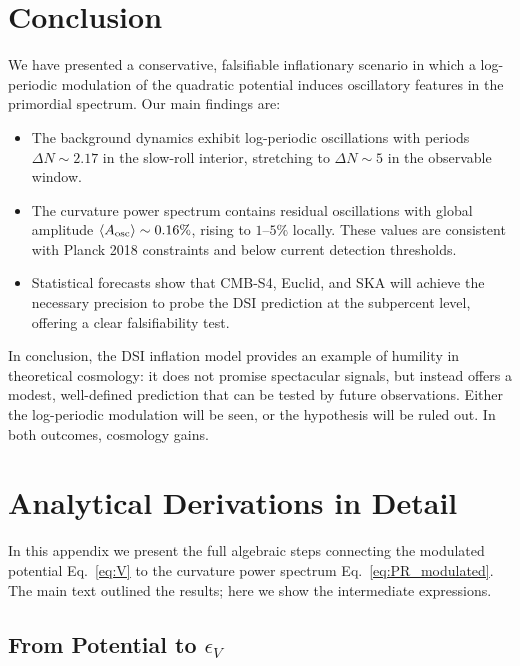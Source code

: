 \documentclass[reprint, amsmath, amssymb, aps, prd, nofootinbib]{revtex4-2}
\begin{document}
\section{Conclusion}

We have presented a conservative, falsifiable inflationary scenario in which
a log-periodic modulation of the quadratic potential induces oscillatory
features in the primordial spectrum. Our main findings are:

\begin{itemize}
    \item The background dynamics exhibit log-periodic oscillations with
    periods $\Delta N \sim 2.17$ in the slow-roll interior, stretching
    to $\Delta N \sim 5$ in the observable window.
    \item The curvature power spectrum contains residual oscillations
    with global amplitude $\langle A_{\rm osc}\rangle \sim 0.16\%$,
    rising to $1$--$5\%$ locally. These values are consistent with
    Planck 2018 constraints and below current detection thresholds.
    \item Statistical forecasts show that CMB-S4, Euclid, and SKA will
    achieve the necessary precision to probe the DSI prediction at the
    subpercent level, offering a clear falsifiability test.
\end{itemize}

In conclusion, the DSI inflation model provides an example of humility
in theoretical cosmology: it does not promise spectacular signals, but
instead offers a modest, well-defined prediction that can be tested by
future observations. Either the log-periodic modulation will be seen,
or the hypothesis will be ruled out. In both outcomes, cosmology gains.

\appendix

\section{Analytical Derivations in Detail}

In this appendix we present the full algebraic steps connecting the
modulated potential Eq.~\eqref{eq:V} to the curvature power spectrum
Eq.~\eqref{eq:PR_modulated}. The main text outlined the results; here
we show the intermediate expressions.

\subsection{From Potential to $\epsilon_V$}
\end{document}

